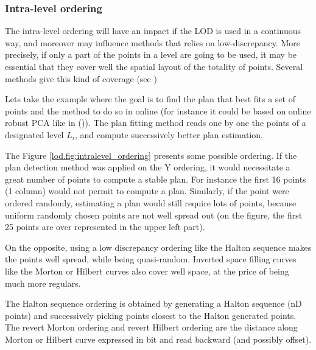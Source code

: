 		\subsubsection{Intra-level ordering}
		\label{lod.method.intralevel}
		
		
		The intra-level ordering will have an impact if the LOD is used in a continuous way,
		and moreover may influence methods that relies on low-discrepancy.
		More precisely, if only a part of the points in a level are going to be used,
		it may be essential that they cover well the spatial layout of the totality of points.
		Several methods give this kind of coverage (see \cite{Rainville2012})
		
		Lets take the example where the goal is to find the plan that best fits a set of points
		and the method to do so in online (for instance it could be based on online robust PCA like in (\cite{Feng2013})).
		The plan fitting method reads one by one the points of a designated level $L_i$, and compute successively better plan estimation.
		
		The Figure \ref{lod.fig:intralevel_ordering} presents some possible ordering. 
		If the plan detection method was applied on the Y ordering, it would necessitate a great number of points to compute a stable plan. For instance the first 16 points (1 column) would not permit to compute a plan.
		Similarly, if the point were ordered randomly, estimating a plan would still require lots of points, because uniform randomly chosen points are not well spread out (on the figure, the first 25 points are over represented in the upper left part).
		
		On the opposite, using a low discrepancy ordering like the Halton sequence makes the points well spread, while being quasi-random.
		Inverted space filling curves like the Morton or Hilbert curves also cover well space, at the price of being much more regulars.
		
		The Halton sequence ordering is obtained by generating a Halton sequence (nD points) and successively picking points closest to the Halton generated points.
		The revert Morton ordering and revert Hilbert ordering are the distance along Morton or Hilbert curve expressed in bit and read backward (and possibly offset).
		


